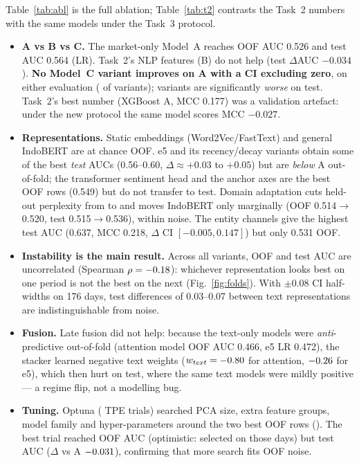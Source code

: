 \documentclass[10pt,a4paper]{article}
\begin{document}
Table~\ref{tab:abl} is the full ablation; Table~\ref{tab:t2} contrasts the Task~2 numbers with the same models under the Task~3 protocol.
\begin{itemize}
\item \textbf{A vs B vs C.} The market-only Model~A reaches OOF AUC 0.526 and test AUC 0.564 (LR). Task~2's NLP features (B) do not help (test $\Delta$AUC $-0.034$). \textbf{No Model~C variant improves on A with a CI excluding zero}, on either evaluation (\NSigBetter{} of \NRows{} variants); \NSigWorse{} variants are significantly \emph{worse} on test. Task~2's best number (XGBoost A, MCC 0.177) was a validation artefact: under the new protocol the same model scores MCC $-0.027$.
\item \textbf{Representations.} Static embeddings (Word2Vec/FastText) and general IndoBERT are at chance OOF. e5 and its recency/decay variants obtain some of the best \emph{test} AUCs (0.56--0.60, $\Delta\approx+0.03$ to $+0.05$) but are \emph{below} A out-of-fold; the transformer sentiment head and the anchor axes are the best OOF rows (0.549) but do not transfer to test. Domain adaptation cuts held-out perplexity from \PplGeneral{} to \PplDapt{} and moves IndoBERT only marginally (OOF 0.514$\to$0.520, test 0.515$\to$0.536), within noise. The entity channels give the highest test AUC (0.637, MCC 0.218, $\Delta$ CI $[-0.005, 0.147]$) but only 0.531 OOF.
\item \textbf{Instability is the main result.} Across all variants, OOF and test AUC are uncorrelated (Spearman $\rho=-0.18$): whichever representation looks best on one period is not the best on the next (Fig.~\ref{fig:folds}). With $\pm0.08$ CI half-widths on 176 days, test differences of 0.03--0.07 between text representations are indistinguishable from noise.
\item \textbf{Fusion.} Late fusion did not help: because the text-only models were \emph{anti}-predictive out-of-fold (attention model OOF AUC 0.466, e5 LR 0.472), the stacker learned negative text weights ($w_{text}=-0.80$ for attention, $-0.26$ for e5), which then hurt on test, where the same text models were mildly positive --- a regime flip, not a modelling bug.
\item \textbf{Tuning.} Optuna (\TunedTrials{} TPE trials) searched PCA size, extra feature groups, model family and hyper-parameters around the two best OOF rows (\TunedStart). The best trial reached OOF AUC \TunedOof{} (optimistic: selected on those days) but test AUC \TunedTest{} ($\Delta$ vs A $-0.031$), confirming that more search fits OOF noise.
\end{itemize}
\end{document}
